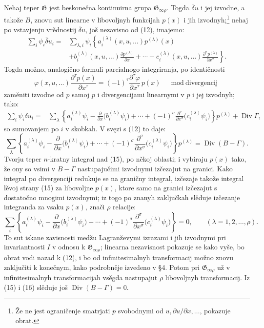 \documentclass[11pt]{article}
\providecommand{\G}{\mathfrak G}
\providecommand{\p}{\partial}
\DeclareMathOperator{\Div}{Div}
\providecommand{\bd}{\bar{\delta}}
\begin{document}
Nehaj teper \(\G\) jest beskonečna kontinuirna grupa \(\G_{\infty\rho}\). Togda \(\bd u\) i jej izvodne, a takože \(B\), znovu sut linearne v libovoljnyh funkcijah \(p(x)\) i jih izvodnyh;\footnote{Že ne jest ograničenje smatrjati \(p\) svobodnymi od \(u,\p u/\p x,\ldots\), pokazuje obrat.} nehaj po vstavjenju vrědnostij \(\bd u\), još nezavisno od (12), imajemo:
\[
\begin{aligned}
\sum_i\psi_i\bd u_i
={}&\sum_{\lambda,i}\psi_i\left\{
a_i^{(\lambda)}(x,u,\ldots)p^{(\lambda)}(x)\right.\\
&\left.
+b_i^{(\lambda)}(x,u,\ldots)\frac{\p p^{(\lambda)}}{\p x}
+\cdots+c_i^{(\lambda)}(x,u,\ldots)
\frac{\p^\sigma p^{(\lambda)}}{\p x^\sigma}\right\}.
\end{aligned}
\]
Togda možno, analogično formuli parcialnogo integriranja, po identičnosti
\[
\varphi(x,u,\ldots)\frac{\p^\tau p(x)}{\p x^\tau}
=(-1)^\tau\frac{\p^\tau\varphi}{\p x^\tau}\,p(x)
\quad \bmod \text{divergencij}
\]
zaměniti izvodne od \(p\) samoj \(p\) i divergencijami linearnymi v \(p\) i jej izvodnyh; tako:
\begin{equation}
\begin{aligned}
\sum_i\psi_i\bd u_i
={}&\sum_\lambda\left\{
a_i^{(\lambda)}\psi_i-\frac{\p}{\p x}\bigl(b_i^{(\lambda)}\psi_i\bigr)
+\cdots+(-1)^\sigma
\frac{\p^\sigma}{\p x^\sigma}\bigl(c_i^{(\lambda)}\psi_i\bigr)
\right\}p^{(\lambda)}+\Div\Gamma,
\end{aligned}
\tag{14}
\end{equation}
so sumovanjem po \(i\) v skobkah. V svęzi s (12) to daje:
\begin{equation}
\sum_\lambda\left\{
a_i^{(\lambda)}\psi_i-\frac{\p}{\p x}\bigl(b_i^{(\lambda)}\psi_i\bigr)
+\cdots+(-1)^\sigma
\frac{\p^\sigma}{\p x^\sigma}\bigl(c_i^{(\lambda)}\psi_i\bigr)
\right\}p^{(\lambda)}
=\Div(B-\Gamma).
\tag{15}
\end{equation}
Tvorju teper \(n\)-kratny integral nad (15), po někoj oblasti; i vybiraju \(p(x)\) tako, že ony so vsimi v \(B-\Gamma\) nastupajučimi izvodnymi izčezajut na granici. Kako integral po divergenciji redukuje se na graničny integral, izčezaje takože integral lěvoj strany (15) za libovoljne \(p(x)\), ktore samo na granici izčezajut s dostatočno mnogimi izvodnymi; iz togo po znanyh zaključkah slěduje izčezanje integranda za vsaku \(p(x)\), znači \(\rho\) relacije:
\begin{equation}
\sum_i\left\{
a_i^{(\lambda)}\psi_i-\frac{\p}{\p x}\bigl(b_i^{(\lambda)}\psi_i\bigr)
+\cdots+(-1)^\sigma
\frac{\p^\sigma}{\p x^\sigma}\bigl(c_i^{(\lambda)}\psi_i\bigr)
\right\}=0,\qquad(\lambda=1,2,\ldots,\rho).
\tag{16}
\end{equation}
To sut iskane zavisnosti medžu Lagranževymi izrazami i jih izvodnymi pri invariantnosti \(I\) v odnosu k \(\G_{\infty\rho}\); linearna nezavisnost pokazuje se kako vyše, bo obrat vodi nazad k (12), i bo od infinitesimalnyh transformacij možno znovu zaključiti k konečnym, kako podrobněje izvedeno v \S{}4. Potom pri \(\G_{\infty\rho}\) už v infinitesimalnyh transformacijah vsěgda nastupajut \(\rho\) libovoljnyh transformacij. Iz (15) i (16) slěduje još \(\Div(B-\Gamma)=0\).
\end{document}
